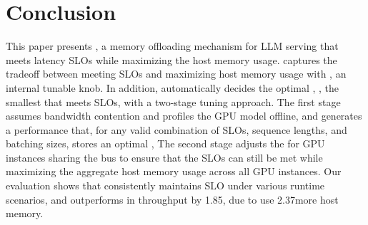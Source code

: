 \section{Conclusion}

This paper presents \sys, a memory offloading mechanism
for LLM serving that meets latency SLOs while maximizing the host 
memory usage. 
%
\sys captures the tradeoff between meeting SLOs and maximizing host memory usage 
with \interval, an internal tunable knob. 
%
In addition, \sys automatically decides the optimal \interval, \ie, the smallest \interval that meets SLOs, with a two-stage tuning approach.  
%
The first stage assumes bandwidth contention and profiles the GPU model offline, and generates a performance \record that, for any valid combination of SLOs, sequence lengths, and batching sizes, stores an optimal \interval,
%
The second stage adjusts the \interval for GPU instances sharing the bus to ensure that the SLOs can still be met while maximizing the aggregate host memory usage across all GPU instances. 
%
Our evaluation shows that \sys consistently maintains SLO under various runtime
scenarios, and outperforms \flexgen in throughput by 1.85\X, due to use 2.37\X more host memory. 


